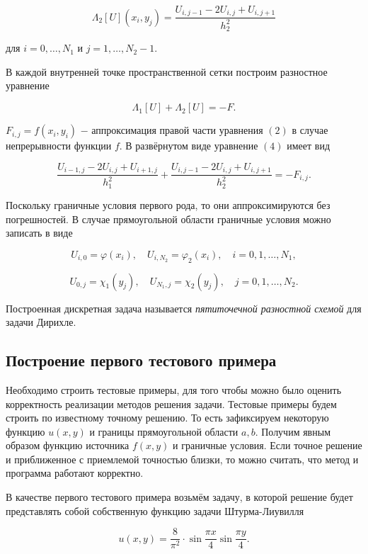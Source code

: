 \documentclass[a4paper, 12pt]{article} %
\begin{document}
\[ \Lambda_2[U](x_i, y_j) = \frac{U_{i, j - 1} - 2U_{i, j} + U_{i, j + 1}}{h_2^2}\]

для $ i = 0, \dots, N_1 $ и $ j = 1, \dots, N_2 - 1 $.

В каждой внутренней точке пространственной сетки построим разностное уравнение

\begin{equation}
\Lambda_1[U] + \Lambda_2[U] = -F.
\end{equation}

$ F_{i, j} = f(x_i, y_i) $ $ - $ аппроксимация правой части уравнения $ (2) $ в случае непрерывности функции $ f $. В развёрнутом виде уравнение $ (4) $ имеет вид

\[ \frac{U_{i - 1, j} - 2 U_{i, j} + U_{i + 1, j}}{h^2_{1}} + \frac{U_{i, j - 1} - 2U_{i, j} + U_{i, j + 1}}{h_2^2} = -F_{i, j}. \]

Поскольку граничные условия первого рода, то они аппроксимируются без погрешностей. В случае прямоугольной области граничные условия можно записать в виде

\[ U_{i, 0} = \varphi(x_i), \quad U_{i, N_2} = \varphi_2(x_i), \quad i = 0, 1, \dots, N_1, \]

\[ U_{0, j} = \chi_1(y_j), \quad U_{N_1, j} = \chi_2(y_j), \quad j = 0, 1, \dots, N_2. \]

Построенная дискретная задача называется \textit{пятиточечной разностной схемой} для задачи Дирихле.

\newpage
 
\subsection{Построение первого тестового примера}

Необходимо строить тестовые примеры, для того чтобы можно было оценить корректность реализации методов решения задачи. Тестовые примеры будем строить по известному точному решению. То есть зафиксируем некоторую функцию $ u(x, y) $ и границы прямоугольной области $ a, b $. Получим явным образом функцию источника $ f(x, y) $ и граничные условия. Если точное решение и приближенное с приемлемой точностью близки, то можно считать, что метод и программа работают корректно.

В качестве первого тестового примера возьмём задачу, в которой решение будет представлять собой собственную функцию задачи Штурма-Лиувилля

\[ u(x, y) = \frac{8}{\pi^2} \cdot \sin{\frac{\pi x}{4}} \sin {\frac{\pi y}{4}}. \]
\end{document}
